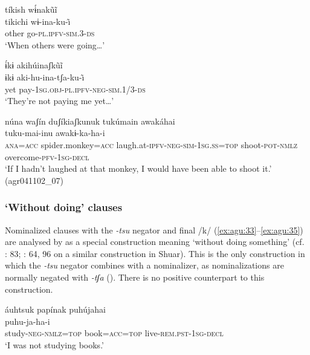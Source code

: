 \documentclass[output=paper,colorlinks,citecolor=brown,draft]{langscibook}
\begin{document}
\ea\label{ex:agu:30}
    \glll tíkish wɨ́nakũĩ \\ 
          tikichi  wɨ-ina-ku-\~\i\\
          other  go-\textsc{pl.ipfv-sim.3-ds}\\
    \glt ‘When others were going…’ \citep[608]{Overall2017a}
\z 

\ea\label{ex:agu:31}
     \glll ɨ́kɨ akihúinaʃkũĩ \\ 
           ɨkɨ  aki-hu-ina-tʃa-ku-\~\i \\
          yet  pay-\textsc{1sg.obj-pl.ipfv-neg-sim.1/3-ds}\\
    \glt ‘They’re not paying me yet…’ \citep[408]{Overall2017a}
\z 

\ea\label{ex:agu:32}
    \glll núna waʃín duʃíkiaʃkunuk tukúmain awakáhai \\ 
          [nu=na  waʃi=na  duʃiki-a-tʃa-ku-nu=ka] tuku-mai-inu  awakɨ{}-ka-ha-i \\
          \textsc{ana=acc}  spider.monkey=\textsc{acc}  laugh.at-\textsc{ipfv-neg-sim-1sg.ss=top} shoot-\textsc{pot-nmlz}  overcome\textsc{{}-pfv-1sg-decl}\\
    \glt ‘If I hadn’t laughed at that monkey, I would have been able to shoot it.’ (agr041102\_07)
\z 

\subsubsection{`Without doing' clauses}\label{sec:agu:2.4.2}

Nominalized clauses with the \textit{{}-tsu} negator and final /k/ (\ref{ex:agu:33}--\ref{ex:agu:35}) are analysed by \citet[404]{Overall2017a} as a special construction meaning `without doing something' (cf. \citealt{PellizaroNáwech2005}: 83; \citealt{Saad2014}: 64, 96 on a similar construction in Shuar). This is the only construction in which the \textit{{}-tsu} negator combines with a nominalizer, as nominalizations are normally negated with \textit{{}-tʃa} (). There is no positive counterpart to this construction.

\ea\label{ex:agu:33}
    \glll áuhtsuk papínak puhújahai \\ 
          [auhu-tsu-u=ka  papi=na=ka]  puhu-ja-ha-i\\
          study\textsc{{}-neg-nmlz=top} book\textsc{=acc=top}  live\textsc{{}-rem.pst-1sg-decl} \\
    \glt ‘I was not studying books.’ \citep[263]{Overall2017a}
\z 
\end{document}

